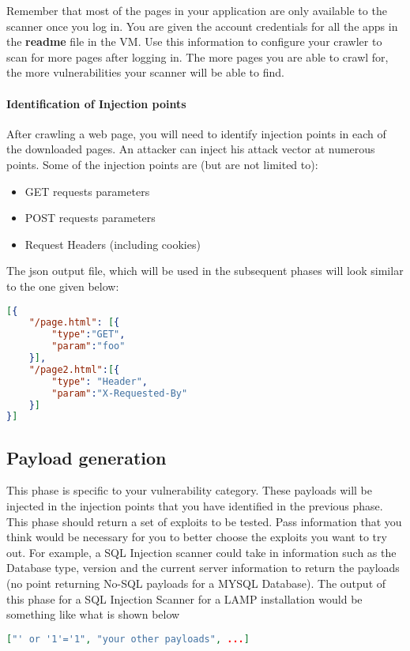 \documentclass{article}[10pt]
\begin{document}
Remember that most of the pages in your application are only available to the scanner once you log in. You are given the account credentials for all the apps in the {\bf readme} file in the VM. Use this information to configure your crawler to scan for more pages after logging in. The more pages you are able to crawl for, the more vulnerabilities your scanner will be able to find.

\paragraph{Identification of Injection points}
After crawling a web page, you will need to identify injection points in each of the downloaded pages. An attacker can inject his attack vector at numerous points. Some of the injection points are (but are not limited to):
	\begin{itemize}
	\item GET requests parameters
	\item POST requests parameters
	\item Request Headers (including cookies)
	\end{itemize}

The json output file, which will be used in the subsequent phases will look similar to the one given below:
\begin{lstlisting}[language=json,firstnumber=1]
[{
	"/page.html": [{
		"type":"GET",
		"param":"foo"
	}],
	"/page2.html":[{
		"type": "Header",
		"param":"X-Requested-By"
	}]
}]
\end{lstlisting}

\subsection{Payload generation}
This phase is specific to your vulnerability category. These payloads will be injected in the injection points that you have identified in the previous phase. 
This phase should return a set of exploits to be tested. Pass information that you think would be necessary for you to better choose the exploits you want to try out. For example, a SQL Injection scanner could take in information such as the Database type, version and the current server information to return the payloads (no point returning No-SQL payloads for a MYSQL Database). The output of this phase for a SQL Injection Scanner for a LAMP installation would be something like what is shown below

\begin{lstlisting}[language=json,firstnumber=1]
["' or '1'='1", "your other payloads", ...]
\end{lstlisting}
\end{document}
